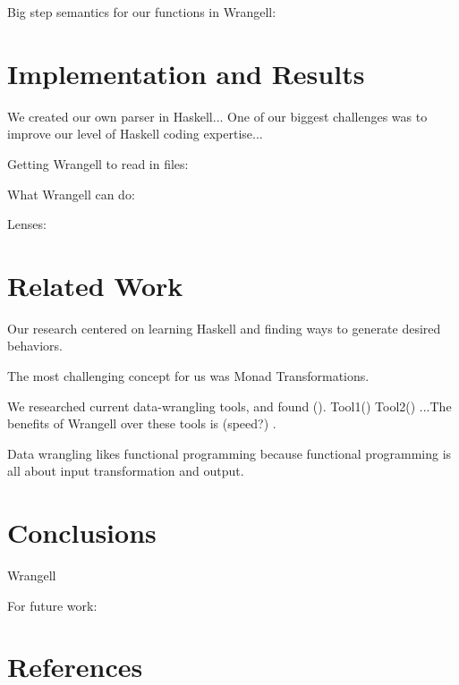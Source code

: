 \documentclass[preprint,nocopyrightspace]{sig-alternate}
\begin{document}
Big step semantics for our functions in Wrangell:

\section{Implementation and Results}
We created our own parser in Haskell... 
One of our biggest challenges was to improve our level of Haskell coding expertise...

Getting Wrangell to read in files:

What Wrangell can do:


Lenses: 

\section{Related Work}

Our research centered on learning Haskell and finding ways to generate desired behaviors. 

The most challenging concept for us was Monad Transformations. 
 


We researched current data-wrangling tools, and found ().
Tool1()
Tool2()
...The benefits of Wrangell over these tools is (speed?) . 


Data wrangling likes functional programming because functional programming is all about input transformation and output. 

\section{Conclusions}
Wrangell 


For future work:


\section{References}
\end{document}
